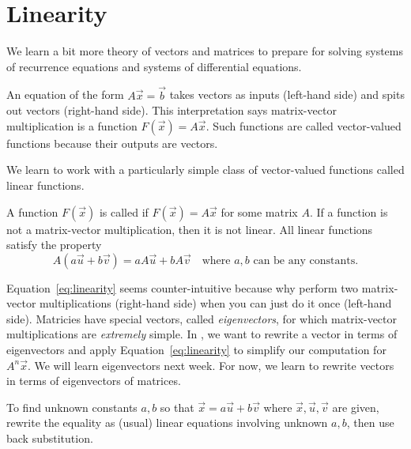 \documentclass[../main.tex]{subfiles}
\begin{document}
 \section{Linearity}

We learn a bit more theory of vectors and matrices  to prepare for solving systems of recurrence equations and systems of differential equations.

An equation of the form \(A \vec{x} = \vec{b}\) takes vectors as inputs (left-hand side) and spits out vectors (right-hand side). This interpretation says matrix-vector multiplication is a function \(F(\vec{x}) = A \vec{x}\). Such functions are called vector-valued functions because their outputs are vectors.


We learn to work with a particularly simple class of vector-valued functions called linear functions.

\begin{definition}[linearity] \label{def:linearity}
  A function \(F(\vec{x})\)  is called  if \(F(\vec{x}) = A\vec{x}\) for some matrix \(A\). If a function is not a matrix-vector multiplication, then it is not linear. All linear functions satisfy the property
  \begin{equation} \label{eq:linearity}
    A(a \vec{u} + b \vec{v}) = a A\vec{u} + b A\vec{v} \quad\text{where \(a,b\) can be any constants.}
  \end{equation}
\end{definition}


Equation~\eqref{eq:linearity} seems counter-intuitive because why perform two matrix-vector multiplications (right-hand side) when you can just do it once (left-hand side).  Matricies have special vectors, called \emph{eigenvectors}, for which matrix-vector multiplications are \emph{extremely} simple.  In \thiscourse{}, we want to rewrite a vector in terms of eigenvectors and apply Equation~\ref{eq:linearity} to simplify our computation for \(A^{n} \vec{x}\). We will learn eigenvectors next week. For now, we learn to rewrite vectors in terms of eigenvectors of matrices.

\begin{method} \label{method:linear-combination}
  To find unknown constants \(a,b\) so that \(\vec{x} = a \vec{u} + b \vec{v}\) where \(\vec{x}, \vec{u}, \vec{v}\) are given, rewrite the equality as (usual) linear equations involving unknown \(a,b\), then use back substitution.
\end{method}
\end{document}
